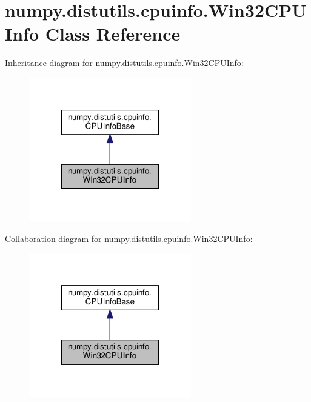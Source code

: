 \hypertarget{classnumpy_1_1distutils_1_1cpuinfo_1_1Win32CPUInfo}{}\section{numpy.\+distutils.\+cpuinfo.\+Win32\+C\+P\+U\+Info Class Reference}
\label{classnumpy_1_1distutils_1_1cpuinfo_1_1Win32CPUInfo}


Inheritance diagram for numpy.\+distutils.\+cpuinfo.\+Win32\+C\+P\+U\+Info\+:
\nopagebreak
\begin{figure}[H]
\begin{center}
\leavevmode
\includegraphics[width=200pt]{classnumpy_1_1distutils_1_1cpuinfo_1_1Win32CPUInfo__inherit__graph}
\end{center}
\end{figure}


Collaboration diagram for numpy.\+distutils.\+cpuinfo.\+Win32\+C\+P\+U\+Info\+:
\nopagebreak
\begin{figure}[H]
\begin{center}
\leavevmode
\includegraphics[width=200pt]{classnumpy_1_1distutils_1_1cpuinfo_1_1Win32CPUInfo__coll__graph}
\end{center}
\end{figure}
